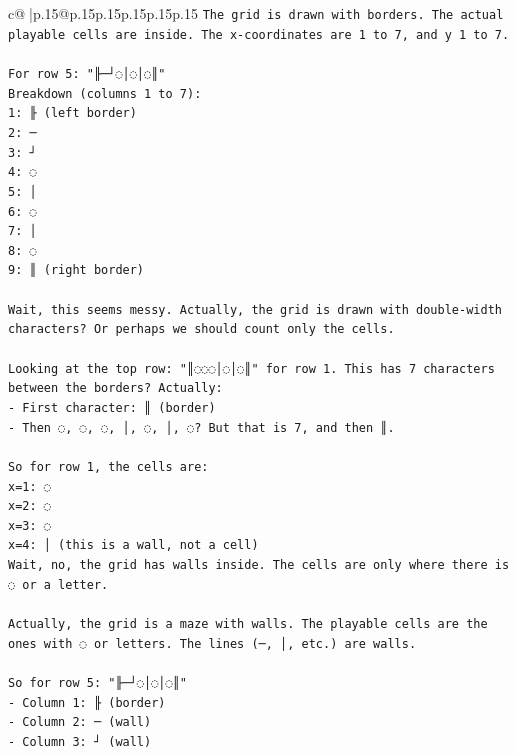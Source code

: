 \documentclass{article}
\begin{document}
{\begin{supertabular}{c@{$\;$}|p{.15\linewidth}@{}p{.15\linewidth}p{.15\linewidth}p{.15\linewidth}p{.15\linewidth}p{.15\linewidth}}
{{{\texttt{The grid is drawn with borders. The actual playable cells are inside. The x{-}coordinates are 1 to 7, and y 1 to 7.} \\
\\ 
\texttt{For row 5: "╟─┘◌│◌│◌║" } \\
\texttt{Breakdown (columns 1 to 7):} \\
\texttt{1: ╟ (left border)} \\
\texttt{2: ─} \\
\texttt{3: ┘} \\
\texttt{4: ◌} \\
\texttt{5: │} \\
\texttt{6: ◌} \\
\texttt{7: │} \\
\texttt{8: ◌} \\
\texttt{9: ║ (right border)} \\
\\ 
\texttt{Wait, this seems messy. Actually, the grid is drawn with double{-}width characters? Or perhaps we should count only the cells.} \\
\\ 
\texttt{Looking at the top row: "║◌◌◌│◌│◌║" for row 1. This has 7 characters between the borders? Actually:} \\
\texttt{{-} First character: ║ (border)} \\
\texttt{{-} Then ◌, ◌, ◌, │, ◌, │, ◌? But that is 7, and then ║.} \\
\\ 
\texttt{So for row 1, the cells are:} \\
\texttt{x=1: ◌} \\
\texttt{x=2: ◌} \\
\texttt{x=3: ◌} \\
\texttt{x=4: │ (this is a wall, not a cell)} \\
\texttt{Wait, no, the grid has walls inside. The cells are only where there is ◌ or a letter.} \\
\\ 
\texttt{Actually, the grid is a maze with walls. The playable cells are the ones with ◌ or letters. The lines (─, │, etc.) are walls.} \\
\\ 
\texttt{So for row 5: "╟─┘◌│◌│◌║"} \\
\texttt{{-} Column 1: ╟ (border)} \\
\texttt{{-} Column 2: ─ (wall)} \\
\texttt{{-} Column 3: ┘ (wall)} \\
}}}
\end{supertabular}}
\end{document}
